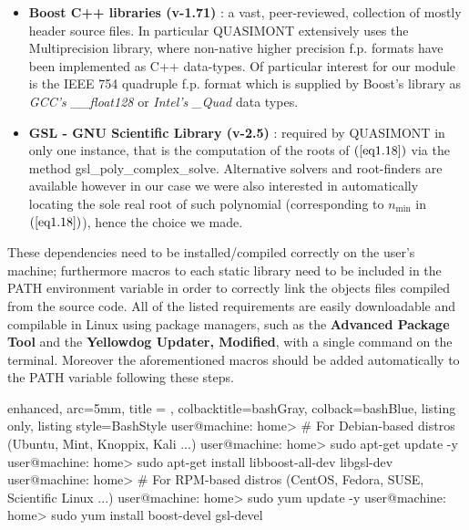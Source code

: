 \documentclass[a4paper, twosided]{book}
\begin{document}
\begin{itemize}
    \item \color{poliDarkBlue} \textbf{Boost C++ libraries (v-1.71)} \color{black}\cite{boost}: a vast, peer-reviewed, collection of mostly header source files. In particular QUASIMONT extensively uses the \colorbox{poliGrayBlue}{Multiprecision} library, where non-native higher precision f.p. formats have been implemented as C++ data-types. Of particular interest for our module is the IEEE 754 quadruple f.p. format which is supplied by Boost's library as {\itshape GCC's \_\_float128} or {\itshape Intel's \_Quad} data types.
    \item \color{poliDarkBlue} \textbf{GSL - GNU Scientific Library (v-2.5)} \color{black}\cite{gsl}: required by QUASIMONT in only one instance, that is the computation of the roots of $(\ref{eq1.18})$ via the method \colorbox{poliGrayBlue}{gsl\_poly\_complex\_solve}. Alternative solvers and root-finders are available however in our case we were also interested in automatically locating the sole real root of such polynomial (corresponding to $n_{\text{min}}$ in $(\ref{eq1.18})$), hence the choice we made.
\end{itemize}

\noindent
These dependencies need to be installed/compiled correctly on the user's machine; furthermore macros to each static library need to be included in the \colorbox{poliGrayBlue}{PATH} environment variable in order to correctly link the objects files compiled from the source code. All of the listed requirements are easily downloadable and compilable in Linux using package managers, such as the \color{poliDarkBlue} \textbf{Advanced Package Tool} \color{black} and the \color{poliDarkBlue} \textbf{Yellowdog Updater, Modified}\color{black}, with a single command on the terminal. Moreover the aforementioned macros should be added automatically to the \colorbox{poliGrayBlue}{PATH} variable following these steps.

\vspace{0.5cm}
\begin{tcblisting}{enhanced,
                   arc=5mm,
                   title = \color{black}{\large \ttfamily Installation of third-party libraries},
                   colbacktitle=bashGray,
                   colback=bashBlue,
                   listing only,
                   listing style=BashStyle}
user@machine: home> # For Debian-based distros (Ubuntu, Mint, Knoppix, Kali ...)
user@machine: home> sudo apt-get update -y
user@machine: home> sudo apt-get install libboost-all-dev libgsl-dev
user@machine: home> # For RPM-based distros (CentOS, Fedora, SUSE, Scientific Linux ...)
user@machine: home> sudo yum update -y
user@machine: home> sudo yum install boost-devel gsl-devel
\end{tcblisting}
\vspace{0.5cm}
\end{document}
